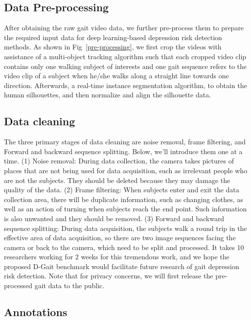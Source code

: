 \documentclass[10pt,twocolumn,letterpaper]{article}
\begin{document}
\subsection{Data Pre-processing}

After obtaining the raw gait video data, we further pre-process them to prepare the required input data for  deep learning-based depression risk detection methods.
As shown in Fig~\ref{pre-processing}, we first crop the videos with assistance of a multi-object tracking algorithm such that each cropped video clip contains only one walking subject of interests and one gait sequence refers to the video clip of a subject when he/she walks along a straight line towards one direction.
Afterwards,  a real-time instance segmentation algorithm, to obtain the human silhouettes, and then normalize and align the silhouette data.



\subsection{Data cleaning}

The three primary stages of data cleaning are noise removal, frame filtering, and Forward and backward sequence splitting. Below, we'll introduce them one at a time.
(1) Noise removal: During data collection, the camera takes pictures of places that are not being used for data acquisition, such as irrelevant people who are not the subjects.
They should be deleted because they may damage the quality of the data.
(2) Frame filtering: When subjects enter and exit the data collection area, there will be duplicate information, such as changing clothes, as well as an action of turning when subjects reach the end point. Such information is also unwanted and they should be removed.
(3) Forward and backward sequence splitting: During data acquisition, the subjects walk a round trip in the effective area of data acquisition, so there are two image sequences facing the camera or back to the camera, which need to be split and processed.
It takes 10 researchers working for 2 weeks for this tremendous work, and we hope the proposed D-Gait benchmark would facilitate future research of gait depression risk detection.
Note that for privacy concerns, we will first release the pre-processed gait data to the public.


\subsection{Annotations}
\end{document}
